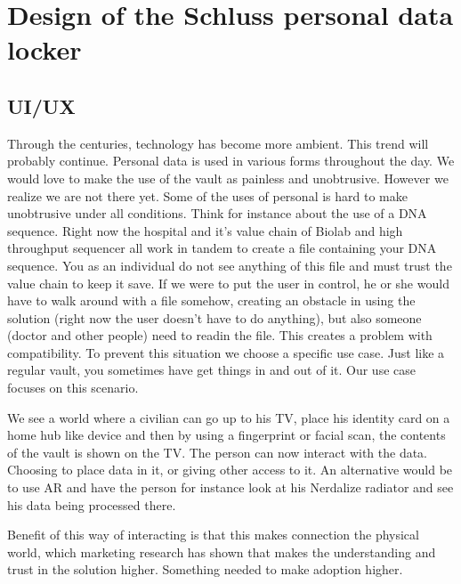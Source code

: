 \documentclass{article}
\begin{document}

\section{Design of the Schluss personal data locker}
\subsection{UI/UX}
Through the centuries, technology has become more ambient. This trend will probably continue. Personal data is used in various forms throughout the day. We would love to make the use of the vault as painless and unobtrusive. However we realize we are not there yet. Some of the uses of personal is hard to make unobtrusive under all conditions. Think for instance about the use of a DNA sequence. Right now the hospital and it's value chain of Biolab and high throughput sequencer all work in tandem to create a file containing your DNA sequence. You as an individual do not see anything of this file and must trust the value chain to keep it save. If we were to put the user in control, he or she would have to walk around with a file somehow, creating an obstacle in using the solution (right now the user doesn't have to do anything), but also someone (doctor and other people) need to readin the file. This creates a problem with compatibility. To prevent this situation we choose a specific use case. Just like a regular vault, you sometimes have get things in and out of it. Our use case focuses on this scenario.

We see a world where a civilian can go up to his TV, place his identity card on a home hub like device and then by using a fingerprint or facial scan, the contents of the vault is shown on the TV. The person can now interact with the data. Choosing to place data in it, or giving other access to it. An alternative would be to use AR and have the person for instance look at his Nerdalize radiator and see his data being processed there.

Benefit of this way of interacting is that this makes connection the physical world, which marketing research has shown that makes the understanding and trust in the solution higher. Something needed to make adoption higher.
\end{document}
